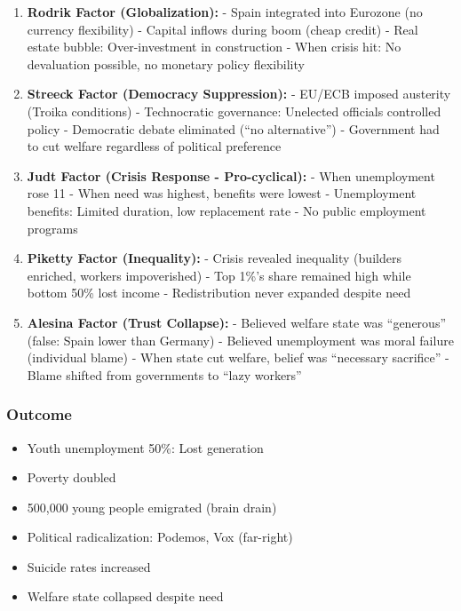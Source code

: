 \begin{enumerate}

\item \textbf{Rodrik Factor (Globalization):}
   - Spain integrated into Eurozone (no currency flexibility)
   - Capital inflows during boom (cheap credit)
   - Real estate bubble: Over-investment in construction
   - When crisis hit: No devaluation possible, no monetary policy flexibility

\item \textbf{Streeck Factor (Democracy Suppression):}
   - EU/ECB imposed austerity (Troika conditions)
   - Technocratic governance: Unelected officials controlled policy
   - Democratic debate eliminated (``no alternative'')
   - Government had to cut welfare regardless of political preference

\item \textbf{Judt Factor (Crisis Response - Pro-cyclical):}
   - When unemployment rose 11%
   - When need was highest, benefits were lowest
   - Unemployment benefits: Limited duration, low replacement rate
   - No public employment programs

\item \textbf{Piketty Factor (Inequality):}
   - Crisis revealed inequality (builders enriched, workers impoverished)
   - Top 1\%'s share remained high while bottom 50\% lost income
   - Redistribution never expanded despite need

\item \textbf{Alesina Factor (Trust Collapse):}
   - Believed welfare state was ``generous'' (false: Spain lower than Germany)
   - Believed unemployment was moral failure (individual blame)
   - When state cut welfare, belief was ``necessary sacrifice''
   - Blame shifted from governments to ``lazy workers''

\end{enumerate}

\subsubsection{Outcome}

\begin{itemize}
\item Youth unemployment 50\%: Lost generation
\item Poverty doubled
\item 500,000 young people emigrated (brain drain)
\item Political radicalization: Podemos, Vox (far-right)
\item Suicide rates increased
\item Welfare state collapsed despite need
\end{itemize}

